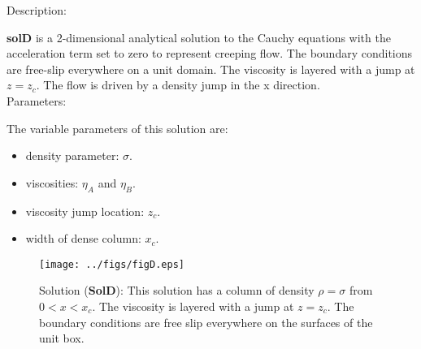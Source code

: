   {\large \fontB Description:}
  
  {\bf solD} is a 2-dimensional analytical solution to the Cauchy equations with the acceleration term set to zero
  to represent creeping flow. The boundary conditions are free-slip everywhere on a unit domain.
  The viscosity is layered with a jump at $ z=z_c $.
  The flow is driven by a density jump in the x direction.
  \\
  
 {\large \fontB Parameters:}
  
 The variable parameters of this solution are:
 \begin{itemize}
   \item{density parameter: $ \sigma $.}
   \item{viscosities: $\eta_A$ and $\eta_B$.}
   \item{viscosity jump location: $z_c$.}
   \item{width of dense column: $x_c$.}
 \end{itemize}

  \begin{SCfigure}[][h]
    \texttt{[image: ../figs/figD.eps]}
    \caption[Short caption]{\label{figD} 
      Solution ({\bf SolD}):
      This solution has a column of density $\rho = \sigma$ from $0 < x < x_c$.
      The viscosity is layered with a jump at $ z=z_c $.
      The boundary conditions are free slip everywhere on the surfaces of the unit box.}
  \end{SCfigure} 
  

